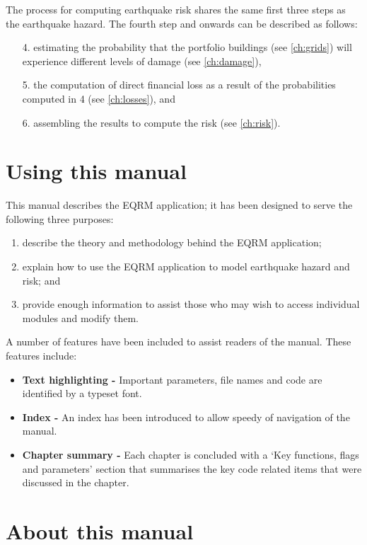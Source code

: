 The process for computing earthquake risk shares the same first
three steps as the earthquake hazard. The fourth step and onwards
can be described as follows:
\begin{enumerate}
\item[4.] estimating the probability that the portfolio buildings
(see \cref{ch:grids}) will experience different levels of damage
(see \cref{ch:damage}), \item[5.] the computation of direct
financial loss as a result of the probabilities computed in 4 (see
\cref{ch:losses}), and \item[6.] assembling the results to compute
the risk (see \cref{ch:risk}).
\end{enumerate}

\section{Using this manual}

This manual describes the EQRM application; it has been designed
to serve the following three purposes:
\begin{enumerate}
\item describe the theory and methodology behind the EQRM
application; \item explain how to use the EQRM application to
model earthquake hazard and risk; and \item provide enough
information to assist those who may wish to access individual
modules and modify them.
\end{enumerate}

A number of features have been included to assist readers of the
manual. These features include:
\begin{itemize}
\item \textbf{Text highlighting -} Important parameters, file
names and code are identified by a typeset font. \item
\textbf{Index -} An index has been introduced to allow speedy of
navigation of the manual. \item \textbf{Chapter summary - } Each
chapter is concluded with a `Key functions, flags and parameters'
section that summarises the key code related items that were
discussed in the chapter.
\end{itemize}


\section{About this manual}

